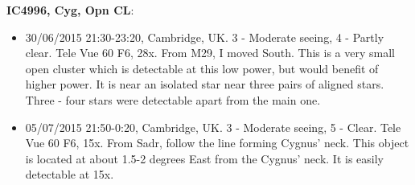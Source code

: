 {\bf IC4996, Cyg, Opn CL}:
\begin{itemize}
\item 30/06/2015 21:30-23:20, Cambridge, UK. 3 - Moderate seeing, 4 - Partly clear. Tele Vue 60 F6, 28x. From M29, I moved South. This is a very small open cluster which is detectable at this low power, but would benefit of higher power. It is near an isolated star near three pairs of aligned stars. Three - four stars were detectable apart from the main one.
\item 05/07/2015 21:50-0:20, Cambridge, UK. 3 - Moderate seeing, 5 - Clear. Tele Vue 60 F6, 15x. From Sadr, follow the line forming Cygnus' neck. This object is located at about 1.5-2 degrees East from the Cygnus' neck. It is easily detectable at 15x.
\end{itemize}

